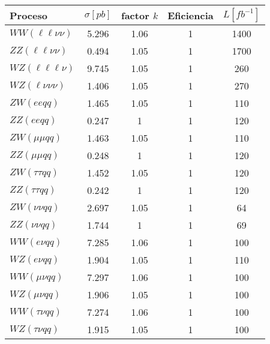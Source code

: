 \begin{table}[ht!]
  \begin{tabular}{lcccc}
    \hline
    Proceso & $\sigma [pb]$ & factor $k$ & Eficiencia & $L [fb^{-1}]$ \\
    \hline
    $WW (\ell\ell\nu\nu)$        & 5.296  & 1.06 & 1 & 1400 \\
    $ZZ (\ell\ell\nu\nu)$        & 0.494  & 1.05 & 1 & 1700 \\
    $WZ (\ell\ell\ell\nu)$       & 9.745  & 1.05 & 1 & 260 \\
    $WZ (\ell\nu\nu\nu)$         & 1.406  & 1.05 & 1 & 270 \\
    $ZW (eeqq)$                  & 1.465  & 1.05 & 1 & 110 \\
    $ZZ (eeqq)$                  & 0.247  & 1    & 1 & 120 \\
    $ZW (\mu\mu qq)$             & 1.463  & 1.05 & 1 & 110 \\
    $ZZ (\mu\mu qq)$             & 0.248  & 1    & 1 & 120 \\
    $ZW (\tau\tau qq)$           & 1.452  & 1.05 & 1 & 120 \\
    $ZZ (\tau\tau qq)$           & 0.242  & 1    & 1 & 120 \\
    $ZW (\nu\nu qq)$             & 2.697  & 1.05 & 1 & 64 \\
    $ZZ (\nu\nu qq)$             & 1.744  & 1    & 1 & 69 \\
    $WW (e\nu qq)$               & 7.285  & 1.06 & 1 & 100 \\
    $WZ (e\nu qq)$               & 1.904  & 1.05 & 1 & 110 \\
    $WW (\mu\nu qq)$             & 7.297  & 1.06 & 1 & 100 \\
    $WZ (\mu\nu qq)$             & 1.906  & 1.05 & 1 & 100 \\
    $WW (\tau\nu qq)$            & 7.274  & 1.06 & 1 & 100 \\
    $WZ (\tau\nu qq)$            & 1.915  & 1.05 & 1 & 100 \\
    \hline
  \end{tabular}
  \label{tab:bkg_diboson_samples}
 \end{table}
